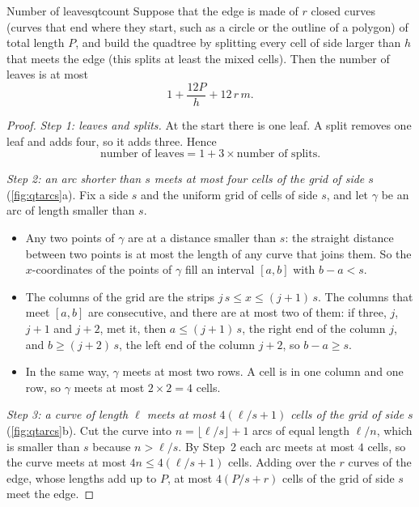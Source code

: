 \begin{proposition}{Number of leaves}{qtcount}
Suppose that the edge is made of $r$ closed curves (curves that end
where they start, such as a circle or the outline of a polygon) of total
length $P$,
and build the quadtree by splitting every cell of side larger than $h$
that meets the edge (this splits at least the mixed cells). Then the
number of leaves is at most
\[
  1+\frac{12P}{h}+12\,r\,m .
\]
\end{proposition}

\begin{proof}
\emph{Step 1: leaves and splits.} At the start there is one leaf. A split
removes one leaf and adds four, so it adds three. Hence
\[
  \text{number of leaves}=1+3\times\text{number of splits}.
\]

\emph{Step 2: an arc shorter than $s$ meets at most four cells of the
grid of side $s$} (\cref{fig:qtarcs}a). Fix a side $s$ and the uniform
grid of cells of side $s$, and let $\gamma$ be an arc of length smaller
than $s$.
\begin{itemize}[nosep]
  \item Any two points of $\gamma$ are at a distance smaller than $s$:
        the straight distance between two points is at most the length
        of any curve that joins them. So the $x$-coordinates of the
        points of $\gamma$ fill an interval $[a,b]$ with $b-a<s$.
  \item The columns of the grid are the strips
        $j\,s\le x\le(j+1)\,s$. The columns that meet $[a,b]$ are
        consecutive, and there are at most two of them: if three, $j$,
        $j+1$ and $j+2$, met it, then $a\le(j+1)\,s$, the right end of
        the column $j$, and $b\ge(j+2)\,s$, the left end of the column
        $j+2$, so $b-a\ge s$.
  \item In the same way, $\gamma$ meets at most two rows. A cell is in
        one column and one row, so $\gamma$ meets at most $2\times2=4$
        cells.
\end{itemize}

\emph{Step 3: a curve of length $\ell$ meets at most $4(\ell/s+1)$ cells
of the grid of side $s$} (\cref{fig:qtarcs}b). Cut the curve into $n=\lfloor\ell/s\rfloor+1$ arcs of equal length $\ell/n$, which is
smaller than $s$ because $n>\ell/s$. By Step~2 each arc meets at most $4$
cells, so the curve meets at most $4n\le4(\ell/s+1)$ cells. Adding over
the $r$ curves of the edge, whose lengths add up to $P$, at most
$4(P/s+r)$ cells of the grid of side $s$ meet the edge.


\end{proof}
